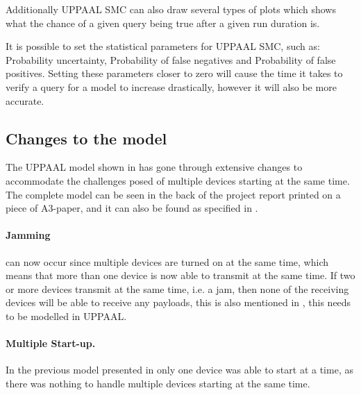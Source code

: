 Additionally UPPAAL SMC can also draw several types of plots which shows what the chance of a given query being true after a given run duration is.

It is possible to set the statistical parameters for UPPAAL SMC, such as: Probability uncertainty, Probability of false negatives and Probability of false positives. 
Setting these parameters closer to zero will cause the time it takes to verify a query for a model to increase drastically, however it will also be more accurate. 


\subsection*{Changes to the model}\label{subsec:changestoModel}

The UPPAAL model shown in  has gone through extensive changes to accommodate the challenges posed of multiple devices starting at the same time.
The complete model can be seen in the back of the project report printed on a piece of A3-paper, and it can also be found as specified in  .


\paragraph{Jamming} can now occur since multiple devices are turned on at the same time, which means that more than one device is now able to transmit at the same time.
If two or more devices transmit at the same time, i.e. a jam, then none of the receiving devices will be able to receive any payloads, this is also mentioned in , this needs to be modelled in UPPAAL. 

\paragraph{Multiple Start-up.}
In the previous model presented in  only one device was able to start at a time, as there was nothing to handle multiple devices starting at the same time.

